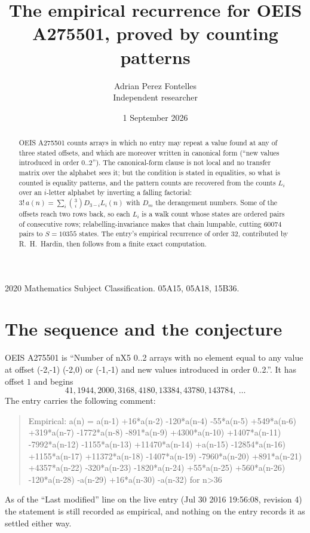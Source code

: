 \documentclass[11pt,a4paper]{article}
\title{The empirical recurrence for OEIS A275501, proved by counting patterns}
\author{Adrian Perez Fontelles\\ \small Independent researcher}
\date{1 September 2026}
\theoremstyle{plain}
\theoremstyle{definition}
\begin{document}
\maketitle

\begin{abstract}
OEIS A275501 counts arrays in which no entry may repeat a value found at any of three stated
offsets, and which are moreover written in canonical form (``new values introduced in order
$0..2$''). The canonical-form clause is not local and no transfer matrix over the
alphabet sees it; but the condition is stated in equalities, so what is counted is equality
patterns, and the pattern counts are recovered from the counts $L_i$ over an $i$-letter
alphabet by inverting a falling factorial:
$3!\,a(n)=\sum_i\binom{3}{i}D_{3-i}L_i(n)$ with $D_m$ the derangement numbers.
Some of the offsets reach two rows back, so each $L_i$ is a walk count whose states are
ordered pairs of consecutive rows; relabelling-invariance makes that chain lumpable,
cutting $60074$ pairs to $S=10355$ states. The entry's empirical recurrence of order $32$,
contributed by R.~H.~Hardin, then follows from a finite exact computation.
\end{abstract}

\noindent\small 2020 Mathematics Subject Classification. 05A15, 05A18, 15B36.\normalsize

\section{The sequence and the conjecture}

OEIS A275501 is ``Number of nX5 0..2 arrays with no element equal to any value at offset (-2,-1) (-2,0) or (-1,-1) and new values introduced in order 0..2.''. It has offset $1$ and begins
\[
41, 1944, 2000, 3168, 4180, 13384, 43780, 143784,\ \dots
\]
The entry carries the following comment:
\begin{quote}\small
Empirical: a(n) = a(n-1) +16*a(n-2) -120*a(n-4) -55*a(n-5) +549*a(n-6) +319*a(n-7) -1772*a(n-8) -891*a(n-9) +4300*a(n-10) +1407*a(n-11) -7992*a(n-12) -1155*a(n-13) +11470*a(n-14) +a(n-15) -12854*a(n-16) +1155*a(n-17) +11372*a(n-18) -1407*a(n-19) -7960*a(n-20) +891*a(n-21) +4357*a(n-22) -320*a(n-23) -1820*a(n-24) +55*a(n-25) +560*a(n-26) -120*a(n-28) -a(n-29) +16*a(n-30) -a(n-32) for n>36
\end{quote}
As of the ``Last modified'' line on the live entry (Jul 30 2016 19:56:08, revision 4) the statement is
still recorded as empirical, and nothing on the entry records it as settled either way.
\end{document}
